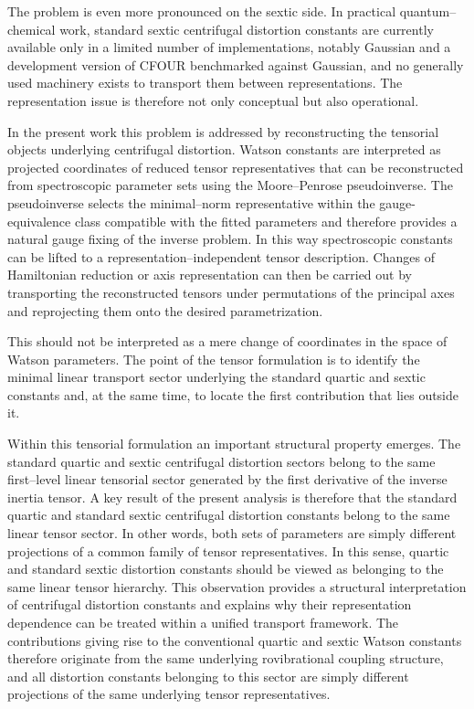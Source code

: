 The problem is even more pronounced on the sextic side.
In practical quantum--chemical work, standard sextic centrifugal
distortion constants are currently available only in a limited number of
implementations, notably Gaussian and a development version of CFOUR
benchmarked against Gaussian, and no generally used machinery exists to
transport them between representations.
The representation issue is therefore not only conceptual but also
operational.

In the present work this problem is addressed by reconstructing the
tensorial objects underlying centrifugal distortion.
Watson constants are interpreted as projected coordinates of reduced
tensor representatives that can be reconstructed from spectroscopic
parameter sets using the Moore--Penrose pseudoinverse.
The pseudoinverse selects the minimal--norm representative within the
gauge-equivalence class compatible with the fitted parameters and
therefore provides a natural gauge fixing of the inverse problem.
In this way spectroscopic constants can be lifted to a
representation--independent tensor description.
Changes of Hamiltonian reduction or axis representation can then be
carried out by transporting the reconstructed tensors under permutations
of the principal axes and reprojecting them onto the desired
parametrization.

This should not be interpreted as a mere change of coordinates in the
space of Watson parameters. The point of the tensor formulation is to
identify the minimal linear transport sector underlying the standard
quartic and sextic constants and, at the same time, to locate the first
contribution that lies outside it.

Within this tensorial formulation an important structural property
emerges.
The standard quartic and sextic centrifugal distortion sectors belong
to the same first--level linear tensorial sector generated by the first
derivative of the inverse inertia tensor.
A key result of the present analysis is therefore that the standard
quartic and standard sextic centrifugal distortion constants belong to
the same linear tensor sector. In other words, both sets of parameters
are simply different projections of a common family of tensor
representatives.
In this sense, quartic and standard sextic distortion constants should
be viewed as belonging to the same linear tensor hierarchy.
This observation provides a structural interpretation of centrifugal
distortion constants and explains why their representation dependence
can be treated within a unified transport framework.
The contributions giving rise to the conventional quartic and sextic
Watson constants therefore originate from the same underlying
rovibrational coupling structure, and all distortion constants
belonging to this sector are simply different projections of the same
underlying tensor representatives.

